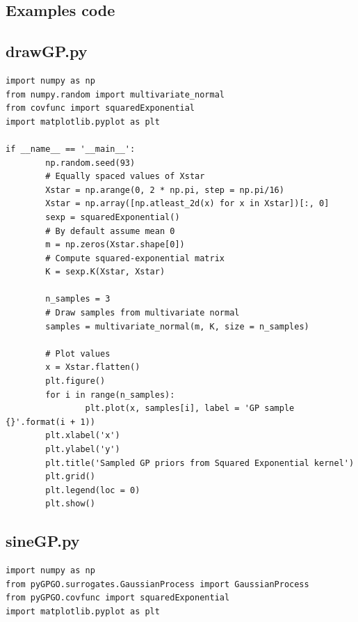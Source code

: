 \documentclass[10pt,a4paper,twoside]{book}
\begin{document}
\begin{appendices}

\chapter{Examples code}
\label{appendix:code}

\section{drawGP.py}
\label{drawGP}
\begin{verbatim}
import numpy as np
from numpy.random import multivariate_normal
from covfunc import squaredExponential
import matplotlib.pyplot as plt

if __name__ == '__main__':
        np.random.seed(93)
        # Equally spaced values of Xstar
        Xstar = np.arange(0, 2 * np.pi, step = np.pi/16)
        Xstar = np.array([np.atleast_2d(x) for x in Xstar])[:, 0]
        sexp = squaredExponential()
        # By default assume mean 0
        m = np.zeros(Xstar.shape[0])
        # Compute squared-exponential matrix
        K = sexp.K(Xstar, Xstar)

        n_samples = 3
        # Draw samples from multivariate normal
        samples = multivariate_normal(m, K, size = n_samples)

        # Plot values
        x = Xstar.flatten()
        plt.figure()
        for i in range(n_samples):
                plt.plot(x, samples[i], label = 'GP sample {}'.format(i + 1))
        plt.xlabel('x')
        plt.ylabel('y')
        plt.title('Sampled GP priors from Squared Exponential kernel')
        plt.grid()
        plt.legend(loc = 0)
        plt.show()	
\end{verbatim}

\section{sineGP.py}
\label{sineGP}
\begin{verbatim}
import numpy as np
from pyGPGO.surrogates.GaussianProcess import GaussianProcess
from pyGPGO.covfunc import squaredExponential
import matplotlib.pyplot as plt


\end{verbatim}
\end{appendices}
\end{document}
